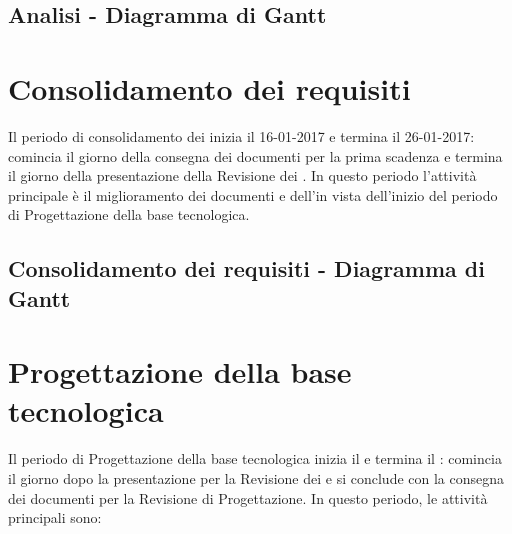 \documentclass[PianoDiProgetto.tex]{subfiles}
\begin{document}
\begin{landscape}
\subsection{Analisi - Diagramma di Gantt}
\end{landscape}	
\section{Consolidamento dei requisiti}
Il periodo di consolidamento dei  inizia il 16-01-2017 e termina il 26-01-2017: comincia il giorno della consegna dei documenti per la prima scadenza e termina il giorno della presentazione della Revisione dei . In questo periodo l'attività principale è il miglioramento dei documenti e dell'\adr in vista dell'inizio del periodo di Progettazione della base tecnologica.
\subsection{Consolidamento dei requisiti - Diagramma di Gantt}

\newpage

\section{Progettazione della base tecnologica}
Il periodo di Progettazione della base tecnologica inizia il  e termina il : comincia il giorno dopo la presentazione per la Revisione dei  e si conclude con la consegna dei documenti per la Revisione di Progettazione. In questo periodo, le attività principali sono:
\end{document}
